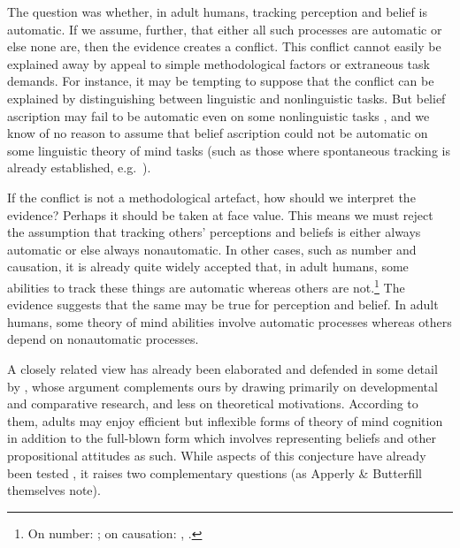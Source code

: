 \documentclass[12pt,\papersize]{extarticle}
\begin{document}
The question was whether, in adult humans,  tracking perception and belief is automatic.  
If we assume, further, that either all such processes are automatic or else none are, then the evidence creates a conflict.
This conflict  cannot easily be explained away by appeal to simple methodological factors or extraneous task demands.
For instance, it may be tempting to suppose that the conflict can be explained by distinguishing between linguistic and nonlinguistic tasks.  
But belief ascription may fail to be automatic even on some nonlinguistic tasks \citep[e.g.][]{apperly:2004_frontal}, and we know of no reason to assume that belief ascription could not be automatic on some linguistic theory of mind tasks (such as those where spontaneous tracking is already established, e.g.\ \citet{ferguson_listeners_2012}).

If the conflict is not a methodological artefact, how should we interpret the evidence?
Perhaps it should be taken at face value.
This means we must reject the assumption that tracking others' perceptions and beliefs is either always automatic or else always nonautomatic.
In other cases, such as number and causation, it is already quite widely accepted that, in adult humans, some abilities to track these things are automatic whereas others are not.\footnote{
On number: \citet{trick:1994_small};
on causation: \citet{Michotte:1946nz}, \citet{Scholl:2004dx}.
}
The evidence suggests that the same may be true for perception and belief.
In adult humans, some theory of mind abilities involve automatic processes whereas others depend on nonautomatic processes. 

A closely related view has already been elaborated and defended in some detail by
\citet[]{Apperly:2009ju},
whose argument complements ours by drawing  primarily on developmental and comparative research, and less on theoretical motivations. 
According to them,
adults may enjoy efficient but inflexible forms of theory of mind cognition in addition to the full-blown form which involves representing beliefs and other propositional attitudes as such.
While aspects of this conjecture have already been tested \citep[]{Samson:2010jm, en_2397, surtees_direct_2011}, it raises two complementary questions (as Apperly \& Butterfill themselves note).  
\end{document}
